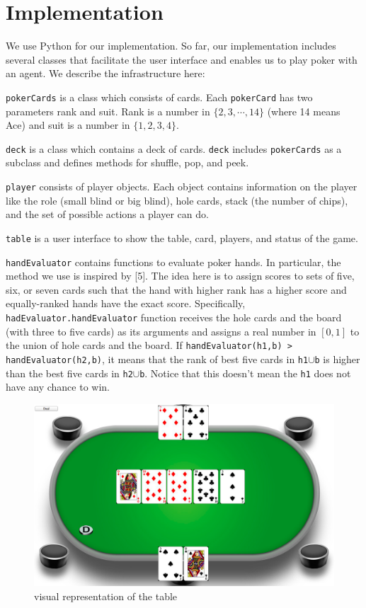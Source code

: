  
\section{Implementation}
We use Python for our implementation. So far, our implementation includes several classes
that facilitate the user interface and enables us to play poker with an agent. We describe the
infrastructure here:

\BIT
\item {\tt pokerCards} is a class which consists of cards. Each {\tt pokerCard} has 
two parameters rank and suit.
Rank is a number in $\{2,3,\cdots,14\}$ (where 14 means Ace) and suit is a number in 
$\{1,2,3,4\}$.
\item {\tt deck} is a class which contains a deck of cards. {\tt deck} includes 
{\tt pokerCards} as a subclass and defines methods for shuffle, pop, and peek.
\item {\tt player} consists of player objects. Each object contains information on the player like
the role (small blind or big blind), hole cards, stack (the number of chips), and the set of
possible actions a player can do.
\item {\tt table} is a user interface to show the table, card, players, and status of the game.
\item {\tt handEvaluator} contains functions to evaluate poker hands.
In particular, the method we use is inspired by [5]. The idea here is to assign scores to sets of
five, six, or seven cards such that the hand with higher rank has a higher score and equally-ranked
hands have the exact score. Specifically, {\tt hadEvaluator.handEvaluator} function 
receives the hole cards and  
the board (with three to five cards) as its arguments and assigns a real number in $[0,1]$
to the union of hole cards and the board. If {\tt handEvaluator(h1,b) > handEvaluator(h2,b)},
it means that the rank of best five cards in {\tt h1$\cup$b} is higher than the best five cards
in {\tt h2$\cup$b}. Notice that this doesn't mean the {\tt h1} does not have any chance to win.
\EIT
\begin{figure}[h!]
  	\centering
 	\includegraphics[scale = .3]{table}
	\caption{visual representation of the table}
\end{figure}

